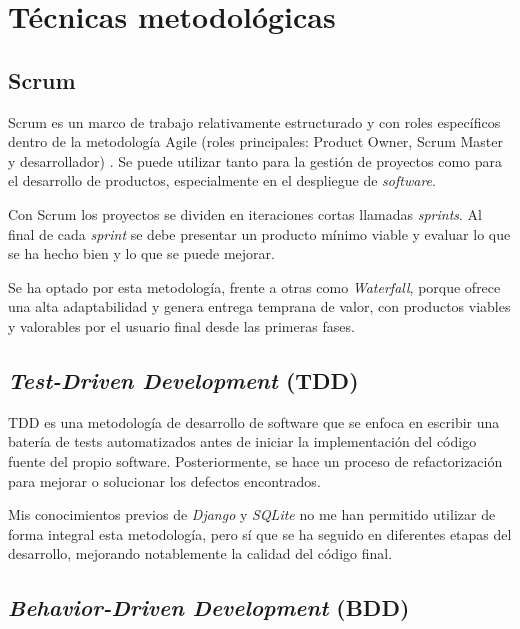 
\section{Técnicas metodológicas}\label{metodologias}

\subsection{Scrum}\label{scrum}

Scrum \citep{wiki:Scrum} es un marco de trabajo relativamente estructurado y con roles específicos 
dentro de la metodología Agile (roles principales: Product Owner, Scrum Master y desarrollador) . Se 
puede utilizar tanto para la gestión de proyectos como para el desarrollo de productos, especialmente 
en el despliegue de \emph{software}. 

Con Scrum los proyectos se dividen en iteraciones cortas llamadas \emph{sprints}. Al final de cada 
\emph{sprint} se debe presentar un producto mínimo viable y evaluar lo que se ha hecho bien y lo 
que se puede mejorar. 

Se ha optado por esta metodología, frente a otras como \emph{Waterfall}, porque ofrece una alta 
adaptabilidad y genera entrega temprana de valor, con productos viables y valorables por el usuario 
final desde las primeras fases. 

\subsection{\emph{Test-Driven Development} (TDD)}\label{test_driven_development_tdd}

TDD \citep{wiki:TDD} es una metodología de desarrollo de software que se enfoca en escribir una batería 
de tests automatizados antes de iniciar la implementación del código fuente del propio software. Posteriormente, 
se hace un proceso de refactorización para mejorar o solucionar los defectos encontrados. 

Mis conocimientos previos de \emph{Django} y \emph{SQLite} no me han permitido utilizar de forma integral 
esta metodología, pero sí que se ha seguido en diferentes etapas del desarrollo, mejorando notablemente la 
calidad del código final. 

\subsection{\emph{Behavior-Driven Development} (BDD)}\label{behavior_driven_development_bdd}

